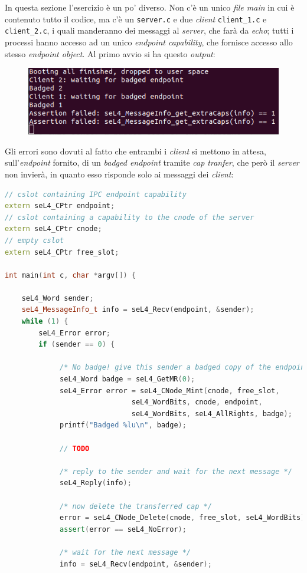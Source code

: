 In questa sezione l'esercizio è un po' diverso. Non c'è un unico \textit{file main} in cui è contenuto tutto il codice, ma c'è un \texttt{server.c} e due \textit{client} \texttt{client\_1.c} e \texttt{client\_2.c}, i quali manderanno dei messaggi al \textit{server}, che farà da \textit{echo}; tutti i processi hanno accesso ad un unico \textit{endpoint capability}, che fornisce accesso allo stesso \textit{endpoint object}. Al primo avvio si ha questo \textit{output}:
\begin{figure}[H]
  \includegraphics[scale=0.7]{img/PrimoAvvioIPC2.png}%
  \centering
  \label{fig:PrimoAvvio}
\end{figure}

Gli errori sono dovuti al fatto che entrambi i \textit{client} si mettono in attesa, sull'\textit{endpoint} fornito, di un \textit{badged endpoint} tramite \textit{cap tranfer}, che però il \textit{server} non invierà, in quanto esso risponde solo ai messaggi dei \textit{client}:
\begin{lstlisting}[language=C++]
// cslot containing IPC endpoint capability
extern seL4_CPtr endpoint;
// cslot containing a capability to the cnode of the server
extern seL4_CPtr cnode;
// empty cslot
extern seL4_CPtr free_slot;

int main(int c, char *argv[]) {

	seL4_Word sender;
    seL4_MessageInfo_t info = seL4_Recv(endpoint, &sender);
    while (1) {
	    seL4_Error error;
        if (sender == 0) {

             /* No badge! give this sender a badged copy of the endpoint */
             seL4_Word badge = seL4_GetMR(0);
             seL4_Error error = seL4_CNode_Mint(cnode, free_slot,
                              seL4_WordBits, cnode, endpoint,
                              seL4_WordBits, seL4_AllRights, badge);
             printf("Badged %lu\n", badge);

             // TODO
             
             /* reply to the sender and wait for the next message */
             seL4_Reply(info);

             /* now delete the transferred cap */
             error = seL4_CNode_Delete(cnode, free_slot, seL4_WordBits);
             assert(error == seL4_NoError);

             /* wait for the next message */
             info = seL4_Recv(endpoint, &sender);
\end{lstlisting}

